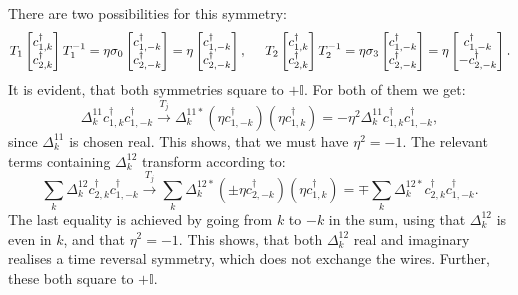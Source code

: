 There are two possibilities for this symmetry: 
\begin{equation}
T_1 \begin{bmatrix} c^\dagger_{1,k} \\ c^\dagger_{2,k} \end{bmatrix} T_1^{-1} = \eta\sigma_0 \begin{bmatrix} c^\dagger_{1,-k} \\ c^\dagger_{2,-k} \end{bmatrix} = \eta\begin{bmatrix} c^\dagger_{1,-k} \\ c^\dagger_{2,-k} \end{bmatrix}, \hspace{0.5cm} T_2 \begin{bmatrix} c^\dagger_{1,k} \\ c^\dagger_{2,k} \end{bmatrix} T_2^{-1} = \eta\sigma_3 \begin{bmatrix} c^\dagger_{1,-k} \\ c^\dagger_{2,-k} \end{bmatrix} = \eta\begin{bmatrix} c^\dagger_{1,-k} \\  - c^\dagger_{2,-k} \end{bmatrix}. \nonumber
\end{equation} 
It is evident, that both symmetries square to $+\mathbb{I}$. For both of them we get: 
\begin{equation}
\Delta^{11}_k c^\dagger_{1,k}c^\dagger_{1,-k} \overset{T_j}{\to} \Delta^{11*}_k \left(\eta c^\dagger_{1,-k}\right)\left(\eta c^\dagger_{1,k}\right) = -\eta^2\Delta^{11}_k c^\dagger_{1,k}c^\dagger_{1,-k}, \nonumber
\end{equation}
since $\Delta^{11}_k$ is chosen real. This shows, that we must have $\eta^2 = -1$. The relevant terms containing $\Delta^{12}_k$ transform according to:
\begin{equation}
\sum_k \Delta^{12}_k c^\dagger_{2,k}c^\dagger_{1,-k} \overset{T_j}{\to} \sum_k \Delta^{12*}_k \left(\pm \eta c^\dagger_{2,-k}\right)\left( \eta c^\dagger_{1,k}\right) = \mp \sum_k \Delta^{12*}_{k} c^\dagger_{2,k}c^\dagger_{1,-k}. \nonumber
\end{equation}
The last equality is achieved by going from $k$ to $-k$ in the sum, using that $\Delta^{12}_k$ is even in $k$, and that $\eta^2 = -1$. This shows, that both $\Delta^{12}_k$ real and imaginary realises a time reversal symmetry, which does not exchange the wires. Further, these both square to $+\mathbb{I}$.

